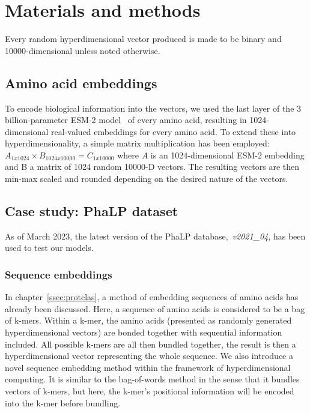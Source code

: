 \chapter[Materials and methods]{Materials and methods}
Every random hyperdimensional vector produced is made to be binary and 10000-dimensional unless noted otherwise. 

\section{Amino acid embeddings}
To encode biological information into the vectors, we used the last layer of the 3 billion-parameter ESM-2 model~\cite{esm2} of every amino acid, resulting in 1024-dimensional real-valued embeddings for every amino acid. To extend these into hyperdimensionality, a simple matrix multiplication has been employed: $A_{1x1024} \times B_{1024x10000} = C_{1x10000}$ where $A$ is an 1024-dimensional ESM-2 embedding and B a matrix of 1024 random 10000-D vectors. The resulting vectors are then min-max scaled and rounded depending on the desired nature of the vectors.

\section{Case study: PhaLP dataset}
As of March 2023, the latest version of the PhaLP database,~\textit{v2021\_04}, has been used to test our models.

\subsection*{Sequence embeddings}
In chapter~\ref{ssec:protclas}, a method of embedding sequences of amino acids has already been discussed. Here, a sequence of amino acids is considered to be a bag of k-mers. Within a k-mer, the amino acids (presented as randomly generated hyperdimensional vectors) are bonded together with sequential information included. All possible k-mers are all then bundled together, the result is then a hyperdimensional vector representing the whole sequence. We also introduce a novel sequence embedding method within the framework of hyperdimensional computing. It is similar to the bag-of-words method in the sense that it bundles vectors of k-mers, but here, the k-mer's positional information will be encoded into the k-mer before bundling. 
